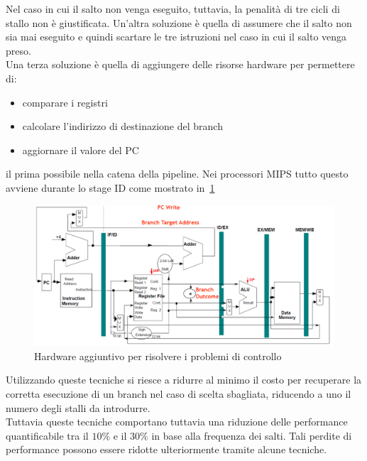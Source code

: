 Nel caso in cui il salto non venga eseguito, tuttavia, la penalità di tre cicli   di stallo non è giustificata. Un'altra soluzione è quella di assumere che il salto non sia mai eseguito e quindi scartare le tre istruzioni nel caso in cui il salto venga preso.\\
Una terza soluzione è quella di aggiungere delle risorse hardware per permettere di:
\begin{itemize}
\item comparare i registri
\item calcolare l'indirizzo di destinazione del branch
\item aggiornare il valore del PC
\end{itemize}
il prima possibile nella catena della pipeline.
Nei processori MIPS tutto questo avviene durante lo stage ID come mostrato in \figurename\,\ref{fig:hwbranch}
\begin{figure}
\centering
\includegraphics[scale=0.4,angle=90]{img/hwbranch.png}
\caption{Hardware aggiuntivo per risolvere i problemi di controllo}\label{fig:hwbranch}
\end{figure}
Utilizzando queste tecniche si riesce a ridurre al minimo il costo per recuperare la corretta esecuzione di un branch nel caso di scelta sbagliata, riducendo a uno il numero degli stalli da introdurre.\\
Tuttavia queste tecniche comportano tuttavia una riduzione delle performance quantificabile tra il $10\%$ e il $30\%$ in base alla frequenza dei salti.
Tali perdite di performance possono essere ridotte ulteriormente tramite alcune tecniche.
